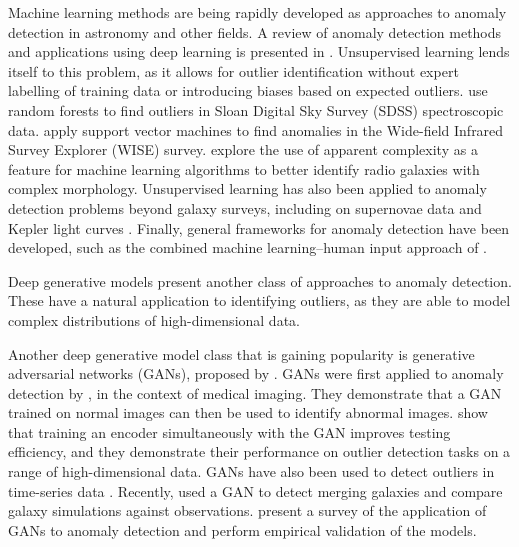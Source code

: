 Machine learning methods are being rapidly developed as approaches to anomaly detection in astronomy and other fields.
A review of anomaly detection methods and applications using deep learning is presented in \cite{Chalapathy2019}.
Unsupervised learning lends itself to this problem, as it allows for outlier identification without expert labelling of training data or introducing biases based on expected outliers.
\cite{Baron2017} use random forests to find outliers in Sloan Digital Sky Survey (SDSS) spectroscopic data.
\cite{Solarz2017} apply support vector machines to find anomalies in the Wide-field Infrared Survey Explorer (WISE) survey.
\cite{Segal2019} explore the use of apparent complexity as a feature for machine learning algorithms to better identify radio galaxies with complex morphology.
Unsupervised learning has also been applied to anomaly detection problems beyond galaxy surveys, including on supernovae data \citep{Pruzhinskaya2019} and Kepler light curves \citep{Giles2019}.
Finally, general frameworks for anomaly detection have been developed, such as the combined machine learning--human input approach of \cite{Lochner2020}.

Deep generative models present another class of approaches to anomaly detection.
These have a natural application to identifying outliers, as they are able to model complex distributions of high-dimensional data.

Another deep generative model class that is gaining popularity is generative adversarial networks (GANs), proposed by \cite{Goodfellow2014}.
GANs were first applied to anomaly detection by \cite{Schlegl2017}, in the context of medical imaging.
They demonstrate that a GAN trained on normal images can then be used to identify abnormal images.
\cite{Zenati2018} show that training an encoder simultaneously with the GAN improves testing efficiency, and they demonstrate their performance on outlier detection tasks on a range of high-dimensional data.
GANs have also been used to detect outliers in time-series data \citep{Li2018}.
Recently, \cite{Margalef-Bentabol2020} used a GAN to detect merging galaxies and compare galaxy simulations against observations. 
\cite{DiMattia2019} present a survey of the application of GANs to anomaly detection and perform empirical validation of the models.

